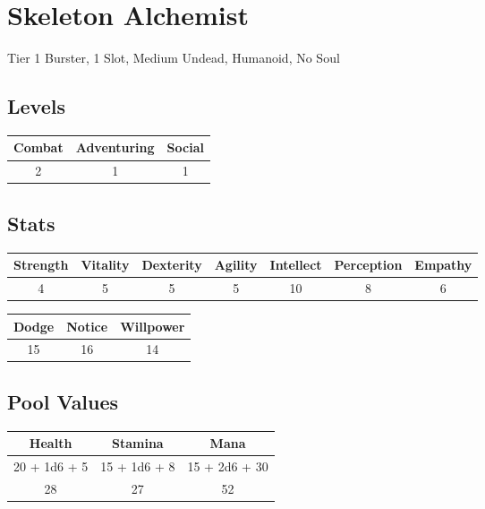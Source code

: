 \section{Skeleton Alchemist}
Tier 1 Burster, 1 Slot, Medium Undead, Humanoid, No Soul\\

\subsection{Levels}
\begin{minipage}[H]{1\textwidth}
    \centering
    \begin{tabular}[c]{|c | c | c|}
        \hline
        Combat & Adventuring & Social\\
        \hline
        2 & 1 & 1\\
        \hline
    \end{tabular}
\end{minipage}

\subsection{Stats}
\begin{minipage}[H]{1\textwidth}
    \centering
    \begin{tabular}[c]{|c | c | c | c | c | c | c|}
        \hline
        Strength & Vitality & Dexterity & Agility & Intellect & Perception & Empathy\\
        \hline
        4 & 5 & 5 & 5 & 10 & 8 & 6\\
        \hline
    \end{tabular}
\end{minipage}

\begin{minipage}[H]{1\textwidth}
    \centering
    \begin{tabular}[c]{|c | c | c|}
        \hline
        Dodge & Notice & Willpower\\
        \hline
        15 & 16 & 14\\
        \hline
    \end{tabular}
\end{minipage}

\subsection{Pool Values}
\begin{minipage}[H]{1\textwidth}
    \centering
    \begin{tabular}[c]{|c | c | c|}
        \hline
        Health & Stamina & Mana\\
        \hline
        20 + 1d6 + 5 & 15 + 1d6 + 8 & 15 + 2d6 + 30\\
        28 & 27 & 52\\
        \hline
    \end{tabular}
\end{minipage}


